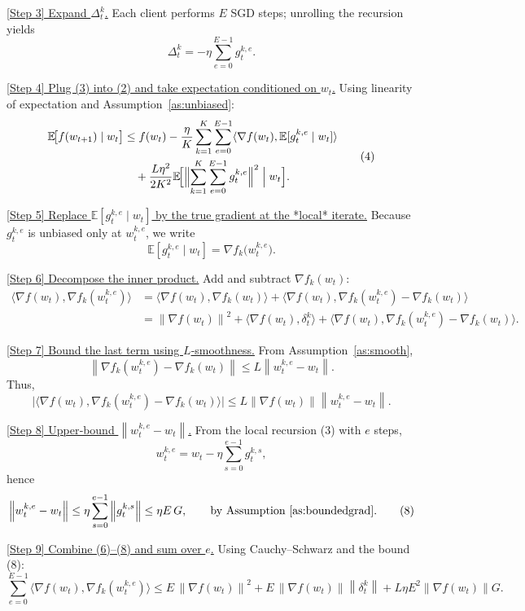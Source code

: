 \documentclass{article}
\newcommand{\E}{\mathbb{E}}
\newcommand{\norm}[1]{\left\|#1\right\|}
\newcommand{\ip}[2]{\langle #1,#2\rangle}
\begin{document}
\noindent\underline{[Step 3] Expand $\Delta_t^{k}$.}
Each client performs $E$ SGD steps; unrolling the recursion yields
\[
    \Delta_t^{k}= -\eta\sum_{e=0}^{E-1} g_{t}^{k,e}. \tag{3}
\]

\noindent\underline{[Step 4] Plug (3) into (2) and take expectation conditioned on $w_t$.}
Using linearity of expectation and Assumption~\ref{as:unbiased}:
\[
\begin{aligned}
\E\!\bigl[f(w_{t+1})\mid w_t\bigr]
&\le f(w_t)
   -\frac{\eta}{K}\sum_{k=1}^{K}\sum_{e=0}^{E-1}
      \ip{\nabla f(w_t)}{\E[g_{t}^{k,e}\mid w_t]} \\
&\quad +\frac{L\eta^{2}}{2K^{2}}
   \E\!\Bigl[\Bigl\|\sum_{k=1}^{K}\sum_{e=0}^{E-1} g_{t}^{k,e}\Bigr\|^{2}\Bigm| w_t\Bigr].
\end{aligned}
\tag{4}
\]

\noindent\underline{[Step 5] Replace $\E[g_{t}^{k,e}\mid w_t]$ by the true gradient at the *local* iterate.}
Because $g_{t}^{k,e}$ is unbiased only at $w_{t}^{k,e}$, we write
\[
    \E[g_{t}^{k,e}\mid w_t]=\nabla f_k\!\bigl(w_{t}^{k,e}\bigr). \tag{5}
\]

\noindent\underline{[Step 6] Decompose the inner product.}
Add and subtract $\nabla f_k(w_t)$:
\[
\begin{aligned}
\ip{\nabla f(w_t)}{\nabla f_k(w_{t}^{k,e})}
&=\ip{\nabla f(w_t)}{\nabla f_k(w_t)}
  +\ip{\nabla f(w_t)}{\nabla f_k(w_{t}^{k,e})-\nabla f_k(w_t)}\\
&= \norm{\nabla f(w_t)}^{2}
   +\ip{\nabla f(w_t)}{\delta_{t}^{k}}
   +\ip{\nabla f(w_t)}{\nabla f_k(w_{t}^{k,e})-\nabla f_k(w_t)} .
\end{aligned}
\tag{6}
\]

\noindent\underline{[Step 7] Bound the last term using $L$‑smoothness.}
From Assumption~\ref{as:smooth},
\[
    \norm{\nabla f_k(w_{t}^{k,e})-\nabla f_k(w_t)}\le L\norm{w_{t}^{k,e}-w_t}.
\]
Thus,
\[
\bigl|\ip{\nabla f(w_t)}{\nabla f_k(w_{t}^{k,e})-\nabla f_k(w_t)}\bigr|
\le L\norm{\nabla f(w_t)}\norm{w_{t}^{k,e}-w_t}. \tag{7}
\]

\noindent\underline{[Step 8] Upper‑bound $\norm{w_{t}^{k,e}-w_t}$.}
From the local recursion (3) with $e$ steps,
\[
    w_{t}^{k,e}=w_t-\eta\sum_{s=0}^{e-1} g_{t}^{k,s},
\]
hence
\[
    \norm{w_{t}^{k,e}-w_t}\le \eta\sum_{s=0}^{e-1}\norm{g_{t}^{k,s}}
    \le \eta E\,G, \qquad\text{by Assumption~\ref{as:boundedgrad}}. \tag{8}
\]

\noindent\underline{[Step 9] Combine (6)–(8) and sum over $e$.}
Using Cauchy–Schwarz and the bound (8):
\[
\sum_{e=0}^{E-1}\ip{\nabla f(w_t)}{\nabla f_k(w_{t}^{k,e})}
\le
E\,\norm{\nabla f(w_t)}^{2}
+E\,\norm{\nabla f(w_t)}\norm{\delta_{t}^{k}}
+L\eta E^{2}\norm{\nabla f(w_t)}G . \tag{9}
\]
\end{document}
